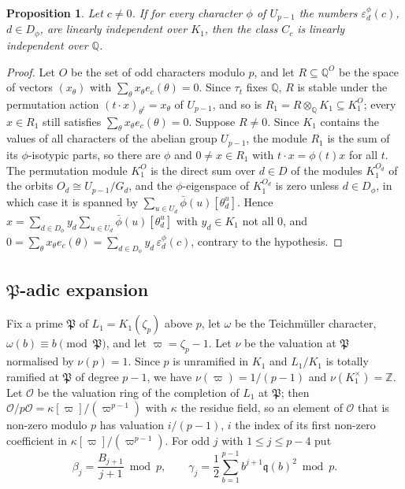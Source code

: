 \documentclass[11pt]{amsart}
\newtheorem{proposition}[theorem]{Proposition}
\theoremstyle{definition}
\theoremstyle{remark}
\providecommand{\Q}{\mathbb Q}
\providecommand{\Z}{\mathbb Z}
\newcommand{\fq}{\mathfrak q}
\newcommand{\fP}{\mathfrak P}
\newcommand{\Ok}{\mathcal O}
\numberwithin{equation}{section}
\begin{document}
\begin{proposition}\label{prop:descent}
Let $c\ne0$. If for every character $\phi$ of $U_{p-1}$ the numbers $\varepsilon_d^\phi(c)$, $d\in D_\phi$, are linearly independent over $K_1$, then the class $C_c$ is linearly independent over $\Q$.
\end{proposition}

\begin{proof}
Let $O$ be the set of odd characters modulo $p$, and let $R\subseteq\Q^O$ be the space of vectors $(x_\theta)$ with $\sum_\theta x_\theta e_c(\theta)=0$.
Since $\tau_t$ fixes $\Q$, $R$ is stable under the permutation action $(t\cdot x)_{\theta^t}=x_\theta$ of $U_{p-1}$, and so is $R_1=R\otimes_\Q K_1\subseteq K_1^O$; every $x\in R_1$ still satisfies $\sum_\theta x_\theta e_c(\theta)=0$.
Suppose $R\ne0$.
Since $K_1$ contains the values of all characters of the abelian group $U_{p-1}$, the module $R_1$ is the sum of its $\phi$-isotypic parts, so there are $\phi$ and $0\ne x\in R_1$ with $t\cdot x=\phi(t)x$ for all $t$.
The permutation module $K_1^O$ is the direct sum over $d\in D$ of the modules $K_1^{O_d}$ of the orbits $O_d\cong U_{p-1}/G_d$, and the $\phi$-eigenspace of $K_1^{O_d}$ is zero unless $d\in D_\phi$, in which case it is spanned by $\sum_{u\in U_d}\bar\phi(u)[\theta_d^u]$.
Hence $x=\sum_{d\in D_\phi}y_d\sum_{u\in U_d}\bar\phi(u)[\theta_d^u]$ with $y_d\in K_1$ not all $0$, and $0=\sum_\theta x_\theta e_c(\theta)=\sum_{d\in D_\phi}y_d\,\varepsilon_d^\phi(c)$, contrary to the hypothesis.
\end{proof}

\subsection{\texorpdfstring{$\fP$}{P}-adic expansion}
Fix a prime $\fP$ of $L_1=K_1(\zeta_p)$ above $p$, let $\omega$ be the Teichm\"uller character, $\omega(b)\equiv b\pmod\fP$, and let $\varpi=\zeta_p-1$.
Let $\nu$ be the valuation at $\fP$ normalised by $\nu(p)=1$.
Since $p$ is unramified in $K_1$ and $L_1/K_1$ is totally ramified at $\fP$ of degree $p-1$, we have $\nu(\varpi)=1/(p-1)$ and $\nu(K_1^\times)=\Z$.
Let $\Ok$ be the valuation ring of the completion of $L_1$ at $\fP$; then $\Ok/p\Ok=\kappa[\varpi]/(\varpi^{p-1})$ with $\kappa$ the residue field, so an element of $\Ok$ that is non-zero modulo $p$ has valuation $i/(p-1)$, $i$ the index of its first non-zero coefficient in $\kappa[\varpi]/(\varpi^{p-1})$.
For odd $j$ with $1\le j\le p-4$ put
\[
\beta_j=\frac{B_{j+1}}{j+1}\bmod p,\qquad \gamma_j=\frac12\sum_{b=1}^{p-1}b^{j+1}\fq(b)^2\bmod p .
\]
\end{document}
